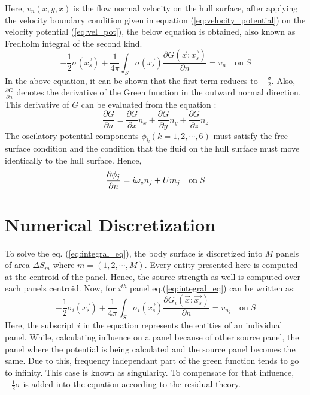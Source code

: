 Here, $v_n(x, y, x)$ is the flow normal velocity on the hull surface, after applying the velocity boundary condition given in equation (\ref{eq:velocity_potential}) on the velocity potential (\ref{eq:vel_pot}), the below equation is obtained, also known as Fredholm integral of the second kind.
\begin{equation}
    \label{eq:integral_eq}
    -\frac{1}{2}\sigma(\vec{x_s}) + \frac{1}{4\pi}\int_S\sigma(\vec{x_s})\frac{\partial G(\vec{x}:\vec{x_s})}{\partial n} = v_n \quad \text{on}\; S
\end{equation}
In the above equation, it can be shown that the first term reduces to $-\frac{\sigma}{2}$. Also, 
$\frac{\partial G}{\partial n}$ denotes the derivative of the Green function in the outward normal direction. This derivative of $G$ can be evaluated from the equation :
\begin{equation}
    \frac{\partial G}{\partial n} = \frac{\partial G}{\partial x}n_x + \frac{\partial G}{\partial y}n_y + \frac{\partial G}{\partial z}n_z
\end{equation}
The oscilatory potential components $\phi_k(k=1, 2, \cdots, 6)$ must satisfy the free-surface condition
and the condition that the fluid on the hull surface must move identically to the hull surface. Hence, 
\begin{equation}
    \frac{\partial \phi_j}{\partial n} = i\omega_e n_j + Um_j \quad \text{on}\; S \\
\end{equation}



\section{Numerical Discretization}
To solve the eq. (\ref{eq:integral_eq}), the body surface is discretized into $M$ panels of area 
$\Delta S_m$ where $m = (1, 2, \cdots, M)$. Every entity presented here is computed at the centroid of the panel.
Hence, the source strength as well is computed over each panels centroid. Now, for $i^{th}$ panel eq.(\ref{eq:integral_eq}) can be written as:
\begin{equation}
    \label{eq:dis_integral_eq}
    -\frac{1}{2}\sigma_i(\vec{x_s}) + \frac{1}{4\pi}\int_S\sigma_i(\vec{x_s})\frac{\partial G_i(\vec{x}:\vec{x_s})}{\partial n} = v_{n_i} \quad \text{on}\; S
\end{equation}
Here, the subscript $i$ in the equation represents the entities of an individual panel.
While, calculating influence on a panel because of other source panel, the panel where the potential is being calculated and the source panel becomes the same. Due to this, frequency independant part of the green function tends to go to infinity. This case is known as singularity. To compensate for that influence, $-\frac{1}{2}\sigma$ is added into the equation according to the residual theory.

